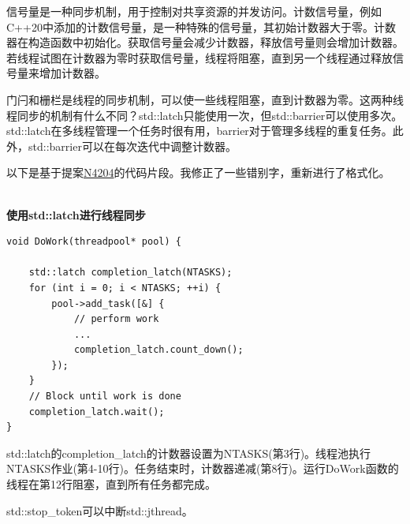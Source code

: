 
信号量是一种同步机制，用于控制对共享资源的并发访问。计数信号量，例如C++20中添加的计数信号量，是一种特殊的信号量，其初始计数器大于零。计数器在构造函数中初始化。获取信号量会减少计数器，释放信号量则会增加计数器。若线程试图在计数器为零时获取信号量，线程将阻塞，直到另一个线程通过释放信号量来增加计数器。



门闩和栅栏是线程的同步机制，可以使一些线程阻塞，直到计数器为零。这两种线程同步的机制有什么不同？std::latch只能使用一次，但std::barrier可以使用多次。std::latch在多线程管理一个任务时很有用，barrier对于管理多线程的重复任务。此外，std::barrier可以在每次迭代中调整计数器。

以下是基于提案\href{http://www.open-std.org/jtc1/sc22/wg21/docs/papers/2014/n4204.html}{N4204}的代码片段。我修正了一些错别字，重新进行了格式化。

\hspace*{\fill} \\ %
\noindent
\textbf{使用std::latch进行线程同步}
\begin{lstlisting}[style=styleCXX]
void DoWork(threadpool* pool) {

	std::latch completion_latch(NTASKS);
	for (int i = 0; i < NTASKS; ++i) {
		pool->add_task([&] {
			// perform work
			...
			completion_latch.count_down();
		});
	}
	// Block until work is done
	completion_latch.wait();
}
\end{lstlisting}

std::latch的completion\_latch的计数器设置为NTASKS(第3行)。线程池执行NTASKS作业(第4-10行)。任务结束时，计数器递减(第8行)。运行DoWork函数的线程在第12行阻塞，直到所有任务都完成。


std::stop\_token可以中断std::jthread。


